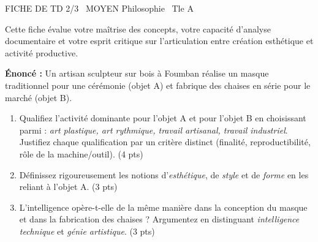 \documentclass[11pt]{article}
\begin{document}
\begin{tcolorbox}[enhanced,colback=popink,colframe=popink,arc=10pt,boxrule=0pt,left=12pt,right=12pt,top=9pt,bottom=9pt]
{\color{white}\popxbold\small FICHE DE TD 2/3 \textbullet\ MOYEN \hfill Philosophie \textbullet\ Tle A\par}
\end{tcolorbox}
\vspace{4pt}
Cette fiche évalue votre maîtrise des concepts, votre capacité d'analyse documentaire et votre esprit critique sur l'articulation entre création esthétique et activité productive.

\begin{exercice}
\textbf{Énoncé :} Un artisan sculpteur sur bois à Foumban réalise un masque traditionnel pour une cérémonie (objet A) et fabrique des chaises en série pour le marché (objet B).
\begin{enumerate}
    \item Qualifiez l'activité dominante pour l'objet A et pour l'objet B en choisissant parmi : \textit{art plastique, art rythmique, travail artisanal, travail industriel}. Justifiez chaque qualification par un critère distinct (finalité, reproductibilité, rôle de la machine/outil). (4 pts)
    \item Définissez rigoureusement les notions d'\textit{esthétique}, de \textit{style} et de \textit{forme} en les reliant à l'objet A. (3 pts)
    \item L'intelligence opère-t-elle de la même manière dans la conception du masque et dans la fabrication des chaises ? Argumentez en distinguant \textit{intelligence technique} et \textit{génie artistique}. (3 pts)
\end{enumerate}
\end{exercice}
\end{document}
